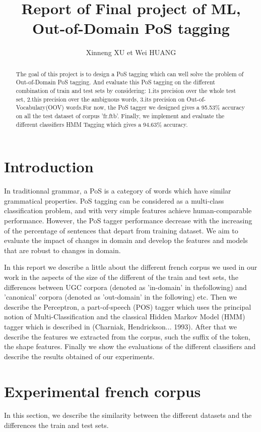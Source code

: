 \documentclass{article}
\title{Report of Final project of ML, Out-of-Domain PoS tagging}
\author{Xinneng XU et Wei HUANG}
\begin{document}
\maketitle

\begin{abstract}
The goal of this project is to design a PoS tagging which can well solve the problem of Out-of-Domain PoS tagging. And evaluate this PoS tagging on the different combination of train and test sets by considering: 1.its precision over the whole test set, 2.this precision over the ambiguous words, 3.its precision on Out-of-Vocabulary(OOV) words.For now, the PoS tagger we designed gives a 95.53\% accuracy on all the test dataset of corpus 'fr.ftb'. Finally, we implement and evaluate the different classifiers HMM Tagging which gives a 94.63\% accuracy.
\end{abstract}


\section{Introduction}
In traditionnal grammar, a PoS is a category of words which have similar grammatical properties. PoS tagging can be considered as a multi-class classification problem, and with very simple features achieve human-comparable performance. However, the PoS tagger performance decrease with the increasing of the percentage of sentences that depart from training dataset. We aim to evaluate the impact of changes in domain and develop the features and models that are robust to changes in domain.

In this report we describe a little about the different french corpus we used in our work in the aspects of the size of the different of the train and test sets, the differences between UGC corpora (denoted as 'in-domain' in thefollowing) and 'canonical' corpora (denoted as 'out-domain' in the following) etc. Then we describe the Perceptron, a part-of-speech (POS) tagger which uses the principal notion of Multi-Classification and the classical Hidden Markov Model (HMM) tagger which is described in (Charniak, Hendrickson... 1993). After that we describe the features we extracted from the corpus, such the suffix of the token, the shape features. Finally we show the evaluations of the different classifiers and describe the results obtained of our experiments.


\section{Experimental french corpus}
In this section, we describe the similarity between the different datasets and the differences the train and test sets.
\end{document}
